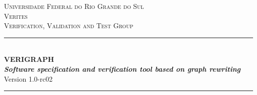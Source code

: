 \documentclass[12pt]{article}
\newcommand{\verigraphversion}{1.0-rc02}
\begin{document}
\begin{titlepage}

\newcommand{\HRule}{\rule{\linewidth}{0.5mm}} %

\center %
 

\textsc{\normalsize Universidade Federal do Rio Grande do Sul}\\[1.0cm] %
\textsc{\Large Verites}\\[0.2cm] %
\textsc{\large Verification, Validation and Test Group}\\[0.2cm] %


\HRule \\[0.4cm]
{ \huge \bfseries \LARGE{VERIGRAPH} \\ [1.0cm]
\emph{\large{Software specification and verification tool based on graph rewriting}}
}\\[0.5cm]

Version \verigraphversion \\[0.4cm] %
\HRule \\[1.0cm]
 




\end{titlepage}
\end{document}
